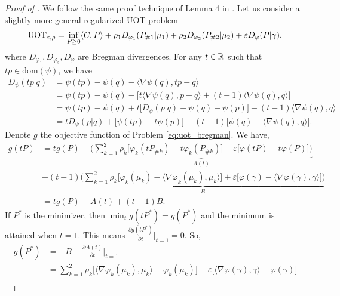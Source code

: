 \begin{proof}[Proof of ]
We follow the same proof technique of Lemma 4 in \citep{Khiem20}.
Let us consider a slightly more general regularized UOT problem
\begin{align}
  \label{eq:uot_bregman}
  \text{UOT}_{\varepsilon, \rho} = \inf_{P \geq 0} \langle C, P \rangle
  + \rho_1 D_{\varphi_1}(P_{\# 1} | \mu_1) +
  \rho_2 D_{\varphi_2}(P_{\# 2} | \mu_2) + \varepsilon D_{\varphi}(P | \gamma),
\end{align}
where $D_{\varphi_1}, D_{\varphi_2}, D_{\varphi}$ are Bregman divergences.
For any $t \in \mathbb R$ such that $tp \in \text{dom}(\psi)$, we have
\begin{align}
  D_{\psi}(t p | q)
  &= \psi(tp) - \psi(q) - \langle \nabla \psi(q), tp - q \rangle \\
  &= \psi(tp) - \psi(q) - \Big[
    t \langle \nabla \psi(q), p - q \rangle + (t-1) \langle \nabla \psi(q), q \rangle
  \Big] \\
  &= \psi(tp) - \psi(q) + t \Big[ D_{\psi}(p | q) + \psi(q) - \psi(p) \Big]
  - (t-1) \langle \nabla \psi(q), q \rangle \\
  &= t D_{\psi}(p | q) + \big[ \psi(tp) - t \psi(p) \big]
  + (t-1) \big[ \psi(q) - \langle \nabla \psi(q), q \rangle \big].
\end{align}
Denote $g$ the objective function of Problem \eqref{eq:uot_bregman}. We have,
\begin{align}
  g(tP) &= t g(P) +
  \underbrace{\Big( \sum_{k=1}^2 \rho_k \big[ \varphi_k(tP_{\# k}) - t \varphi_k(P_{\# k}) \big]
  + \varepsilon \big[ \varphi(tP) - t \varphi(P) \big] \Big)}_{A(t)} \\
  &+ (t-1) \underbrace{\Big(
    \sum_{k=1}^2 \rho_k \big[ \varphi_k(\mu_k) - \langle \nabla \varphi_k(\mu_k), \mu_k \rangle \big]
    + \varepsilon \big[ \varphi(\gamma) - \langle \nabla \varphi(\gamma), \gamma \rangle \big]
    \Big)}_{B} \\
    &= t g(P) + A(t) + (t-1) B.
\end{align}
If $P^*$ is the minimizer, then $\min_t g(tP^*) = g(P^*)$ and the minimum is attained
when $t=1$. This means $\frac{\partial g(tP^*)}{\partial t} \Big |_{t = 1} = 0$. So,
\begin{align}
  g(P^*) &= - B - \frac{\partial A(t)}{\partial t} \bigg|_{t=1} \\
  &=
  \sum_{k=1}^2 \rho_k \Big[ \langle \nabla \varphi_k(\mu_k), \mu_k \rangle - \varphi_k(\mu_k) \Big]
  + \varepsilon \Big[ \langle \nabla \varphi(\gamma), \gamma \rangle - \varphi(\gamma) \Big] \\

\end{align}
\end{proof}
